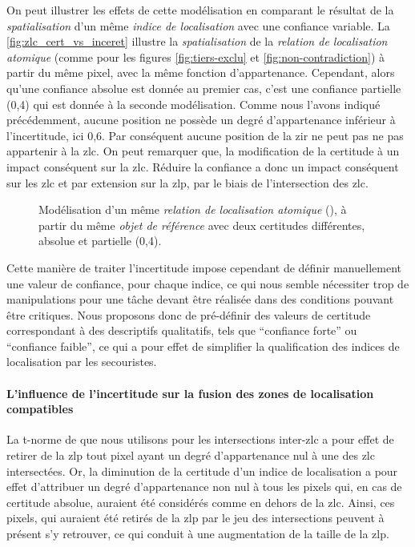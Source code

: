 On peut illustrer les effets de cette modélisation en comparant le
résultat de la \emph{spatialisation} d'un même \emph{indice de
  localisation} avec une confiance variable. La
\autoref{fig:zlc_cert_vs_inceret} illustre la \emph{spatialisation} de
la \emph{relation de localisation atomique} 
(comme pour les figures \ref{fig:tiers-exclu} et
\ref{fig:non-contradiction}) à partir du même pixel, avec la même
fonction d'appartenance. Cependant, alors qu'une confiance absolue est
donnée au premier cas, c'est une confiance partielle (0,4) qui est
donnée à la seconde modélisation. Comme nous l'avons indiqué
précédemment, aucune position ne possède un degré d'appartenance
inférieur à l'incertitude, ici 0,6. Par conséquent aucune position de
la \ac{zir} ne peut pas ne pas appartenir à la \ac{zlc}. On peut
remarquer que, la modification de la certitude à un impact conséquent
sur la \ac{zlc}. Réduire la confiance a donc un impact conséquent sur
les \ac{zlc} et par extension sur la \ac{zlp}, par le biais de
l'intersection des \ac{zlc}.

\begin{figure}
  \centering
  \subfloat[]{}\hspace{2cm}
  \subfloat[]{}
  \caption{Modélisation d'un même \emph{relation de localisation
      atomique} (\protect{}), à partir du même
    \emph{objet de référence} avec deux certitudes différentes,
    absolue et partielle (0,4).}
  \label{fig:zlc_cert_vs_inceret}
\end{figure}

Cette manière de traiter l'incertitude impose cependant de définir
manuellement une valeur de confiance, pour chaque indice, ce qui nous
semble nécessiter trop de manipulations pour une tâche devant être
réalisée dans des conditions pouvant être critiques. Nous proposons
donc de pré-définir des valeurs de certitude correspondant à des
descriptifs qualitatifs, tels que \enquote{confiance forte} ou
\enquote{confiance faible}, ce qui a pour effet de simplifier la
qualification des indices de localisation par les secouristes.

\paragraph{L'influence de l'incertitude sur la fusion des zones de
  localisation compatibles}

La t-norme de  que nous utilisons pour les intersections
inter-\ac{zlc} a pour effet de retirer de la \ac{zlp} tout pixel ayant
un degré d'appartenance nul à une des \ac{zlc} intersectées. Or, la
diminution de la certitude d'un indice de localisation a pour effet
d'attribuer un degré d'appartenance non nul à tous les pixels qui, en
cas de certitude absolue, auraient été considérés comme en dehors de
la \ac{zlc}. Ainsi, ces pixels, qui auraient été retirés de la
\ac{zlp} par le jeu des intersections peuvent à présent s'y retrouver,
ce qui conduit à une augmentation de la taille de la \ac{zlp}.

